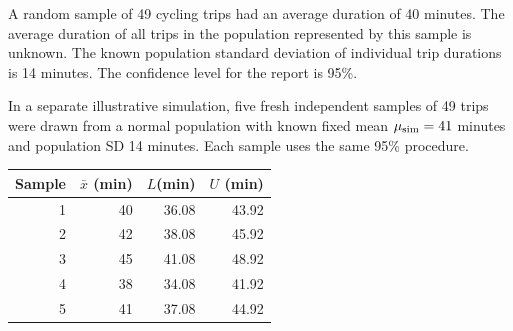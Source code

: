 \noindent\begin{minipage}[t]{0.60\linewidth}
\vspace{0pt}
A random sample of 49 cycling trips had an average duration of 40 minutes. The average duration of all trips in the population represented by this sample is unknown. The known population standard deviation of individual trip durations is 14 minutes. The confidence level for the report is 95\%.

In a separate illustrative simulation, five fresh independent samples of 49 trips were drawn from a normal population with known fixed mean $\mu_{\rm sim}=41$ minutes and population SD 14 minutes. Each sample uses the same 95\% procedure.
\end{minipage}\hfill
\begin{minipage}[t]{0.38\linewidth}
\vspace{0pt}
\centering
\begin{tabular}{@{}rrrr@{}}\toprule
Sample&$\bar{x}$ (min)& $L$(min)&$U$ (min)\\\midrule
1&40&36.08&43.92\\
2&42&38.08&45.92\\
3&45&41.08&48.92\\
4&38&34.08&41.92\\
5&41&37.08&44.92\\\bottomrule
\end{tabular}
\end{minipage}\par

\vspace{-3mm}
